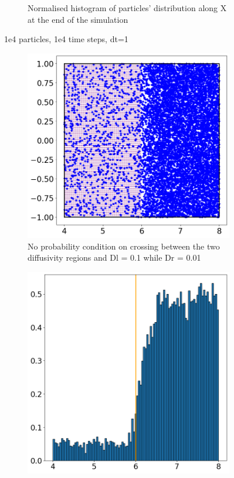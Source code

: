 \documentclass{article}
\begin{document}
\begin{figure}[htbp]
\begin{subfigure}[b]{0.45\textwidth}
        \caption{Normalised histogram of particles' distribution along X at the end of the simulation}
    \end{subfigure}
    \caption{1e4 particles, 1e4 time steps, dt=1}
    \label{fig:MatrixDiffusion1}
\end{figure}

\begin{figure}[htbp]
    \centering
    \begin{subfigure}[b]{0.45\textwidth}
        \centering
        \includegraphics[width=\textwidth]{images/positionsDl01Dr001Rl0Rr0.png}
        \caption{No probability condition on crossing between the two diffusivity regions and Dl = 0.1 while Dr = 0.01}
    \end{subfigure}
    \hfill
    \begin{subfigure}[b]{0.45\textwidth}
        \centering
        \includegraphics[width=\textwidth]{images/histDl01Dr001Rl0Rr0.png}

\end{subfigure}
\end{figure}
\end{document}
